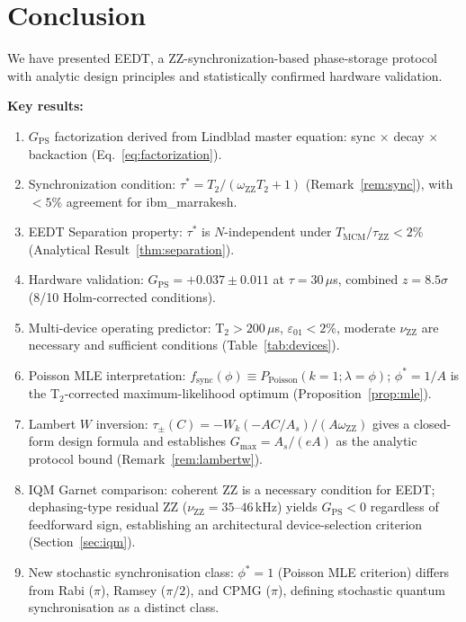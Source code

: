 \documentclass[10pt,twocolumn]{article}
\newcommand{\GPS}{G_{\mathrm{PS}}}
\newcommand{\nuZZ}{\nu_{\mathrm{ZZ}}}
\newcommand{\oZZ}{\omega_{\mathrm{ZZ}}}
\newcommand{\Tmc}{T_{\mathrm{MCM}}}
\newcommand{\taustar}{\tau^*}
\newcommand{\eps}{\varepsilon}
\begin{document}
\section{Conclusion}

We have presented EEDT, a ZZ-synchronization-based phase-storage protocol
with analytic design principles and statistically confirmed hardware validation.

\textbf{Key results:}
\begin{enumerate}[leftmargin=*, itemsep=1pt, topsep=2pt]
  \item $\GPS$ factorization derived from Lindblad master equation:
    sync $\times$ decay $\times$ backaction (Eq.~\ref{eq:factorization}).
  \item Synchronization condition: $\taustar = T_2/(\oZZ T_2+1)$
    (Remark~\ref{rem:sync}), with $<5\%$ agreement for ibm\_marrakesh.
  \item EEDT Separation property: $\taustar$ is $N$-independent under
    $\Tmc/\tau_\mathrm{ZZ} < 2\%$ (Analytical Result~\ref{thm:separation}).
  \item Hardware validation: $\GPS = +0.037\pm0.011$ at $\tau=30\,\mu$s,
    combined $z = 8.5\sigma$ (8/10 Holm-corrected conditions).
  \item Multi-device operating predictor: T$_2 > 200\,\mu$s,
    $\eps_{01} < 2\%$, moderate $\nuZZ$ are necessary and sufficient
    conditions (Table~\ref{tab:devices}).
  \item Poisson MLE interpretation: $f_\mathrm{sync}(\phi)\equiv
    P_\mathrm{Poisson}(k{=}1;\lambda{=}\phi)$; $\phi^*=1/A$ is the
    T$_2$-corrected maximum-likelihood optimum
    (Proposition~\ref{prop:mle}).
  \item Lambert $W$ inversion: $\tau_{\pm}(C)=-W_k(-AC/A_s)/(A\oZZ)$
    gives a closed-form design formula and establishes
    $G_\mathrm{max}=A_s/(eA)$ as the analytic protocol bound
    (Remark~\ref{rem:lambertw}).
  \item IQM Garnet comparison: coherent ZZ is a necessary condition for EEDT;
    dephasing-type residual ZZ ($\nuZZ=35$--$46$\,kHz) yields $\GPS<0$
    regardless of feedforward sign, establishing an architectural
    device-selection criterion (Section~\ref{sec:iqm}).
  \item New stochastic synchronisation class: $\phi^*=1$ (Poisson MLE criterion)
    differs from Rabi ($\pi$), Ramsey ($\pi/2$), and CPMG ($\pi$),
    defining stochastic quantum synchronisation as a distinct class.
\end{enumerate}
\end{document}
